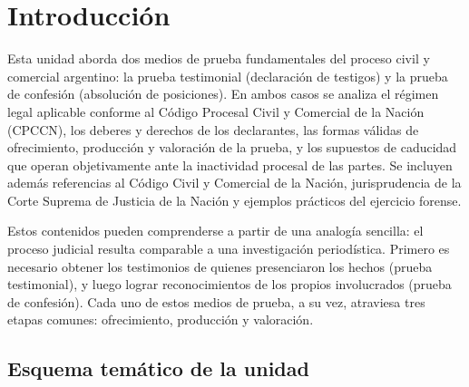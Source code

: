 \documentclass[12pt,oneside]{book}
\begin{document}
\chapter*{Introducción}

Esta unidad aborda dos medios de prueba fundamentales del proceso civil y comercial argentino: la prueba testimonial (declaración de testigos) y la prueba de confesión (absolución de posiciones). En ambos casos se analiza el régimen legal aplicable conforme al Código Procesal Civil y Comercial de la Nación (CPCCN), los deberes y derechos de los declarantes, las formas válidas de ofrecimiento, producción y valoración de la prueba, y los supuestos de caducidad que operan objetivamente ante la inactividad procesal de las partes. Se incluyen además referencias al Código Civil y Comercial de la Nación, jurisprudencia de la Corte Suprema de Justicia de la Nación y ejemplos prácticos del ejercicio forense.

Estos contenidos pueden comprenderse a partir de una analogía sencilla: el proceso judicial resulta comparable a una investigación periodística. Primero es necesario obtener los testimonios de quienes presenciaron los hechos (prueba testimonial), y luego lograr reconocimientos de los propios involucrados (prueba de confesión). Cada uno de estos medios de prueba, a su vez, atraviesa tres etapas comunes: ofrecimiento, producción y valoración.

\section*{Esquema temático de la unidad}
\end{document}
